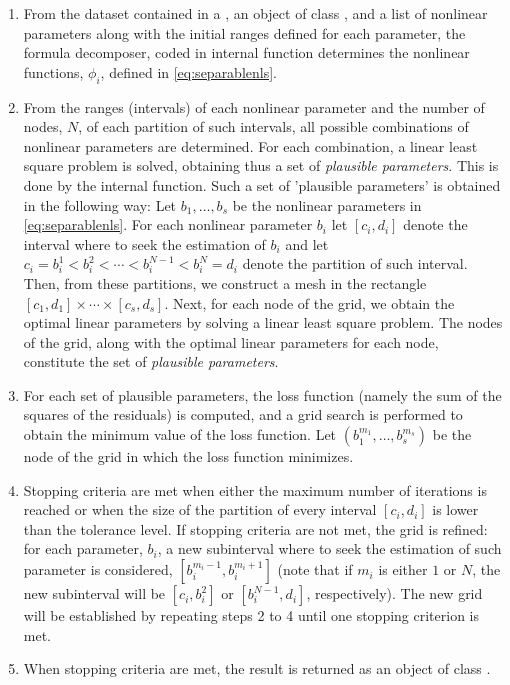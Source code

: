 \begin{enumerate}
\item From the dataset contained in a ,  an object of class , and a list of nonlinear parameters along with the initial ranges defined for each parameter, the formula decomposer, coded in internal function  determines the nonlinear functions, $\phi_i$, defined in \eqref{eq:separablenls}.
\item From the ranges (intervals) of each nonlinear parameter and the number of nodes, $N$, of each partition of such intervals, all possible combinations of nonlinear parameters are determined. For each combination, a linear least square problem is solved, obtaining thus a set of \textit{plausible parameters}. This is done by the   internal function. %
Such a set of 'plausible parameters' is obtained in the following way: Let $b_1,\ldots,b_s$ be the nonlinear parameters in \eqref{eq:separablenls}. For each nonlinear parameter $b_i$ let $[c_i,d_i]$ denote the interval where to seek the estimation of $b_i$ and let  $c_i=b_i^1<b_i^2< \cdots < b_i^{N-1} < b_i^N =d_i$ denote the partition of such interval. Then, from these partitions, we construct a mesh in the rectangle $[c_1,d_1] \times \cdots \times [c_s,d_s]$. Next, for each node of the grid, we obtain the optimal linear parameters by solving a linear least square problem. The nodes of the grid, along with the optimal linear parameters for each node, constitute the set of \textit{plausible parameters}.
\item For each set of plausible parameters, the loss function (namely the sum of the squares of the residuals) is computed, and a grid search is performed to obtain the minimum value of the loss function. Let $(b_1^{m_1}, \ldots, b_s^{m_s})$ be the node of the grid in which the loss function minimizes.
\item  Stopping criteria are met when either the maximum number of iterations is reached or when the size of the partition of every interval $[c_i,d_i]$ is lower than the tolerance level. If stopping criteria are not met, the grid is refined: for each parameter, $b_i$, a new subinterval where to seek the estimation of such parameter is considered, $[b_i^{m_i-1},b_i^{m_i+1}]$ (note that if $m_i$ is either $1$ or $N$, the new subinterval will be $[c_i,b_i^2]$ or $[b_i^{N-1},d_i]$, respectively). The new grid will be established by repeating steps 2 to 4 until one stopping criterion is met.
\item When stopping criteria are met, the result is returned as an object of class . 
\end{enumerate}


